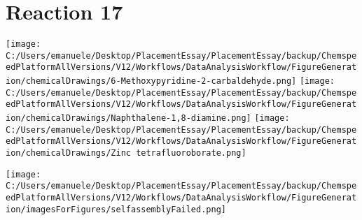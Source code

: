\documentclass{article}%
\begin{document}
\section*{Reaction 17}%
%
\begin{scheme}[H]%
\begin{minipage}{0.5\textwidth}%
\texttt{[image: C:/Users/emanuele/Desktop/PlacementEssay/PlacementEssay/backup/ChemspeedPlatformAllVersions/V12/Workflows/DataAnalysisWorkflow/FigureGeneration/chemicalDrawings/6-Methoxypyridine-2-carbaldehyde.png]}%
\texttt{[image: C:/Users/emanuele/Desktop/PlacementEssay/PlacementEssay/backup/ChemspeedPlatformAllVersions/V12/Workflows/DataAnalysisWorkflow/FigureGeneration/chemicalDrawings/Naphthalene-1,8-diamine.png]}%
\texttt{[image: C:/Users/emanuele/Desktop/PlacementEssay/PlacementEssay/backup/ChemspeedPlatformAllVersions/V12/Workflows/DataAnalysisWorkflow/FigureGeneration/chemicalDrawings/Zinc tetrafluoroborate.png]}%
\end{minipage}%
\begin{minipage}{0.5\textwidth}%
\begin{center}%
\texttt{[image: C:/Users/emanuele/Desktop/PlacementEssay/PlacementEssay/backup/ChemspeedPlatformAllVersions/V12/Workflows/DataAnalysisWorkflow/FigureGeneration/imagesForFigures/selfassemblyFailed.png]}%
\end{center}%
\end{minipage}%
\caption{Self-assembly of components 6, 21, with Zinc(II) in a 3.0:1.5:1.0 molar ratio in CH$_3$CN at 60\textdegree C for 40h. These are the reagents (starting materials) for reaction 17.}%
\end{scheme}%
\end{document}
